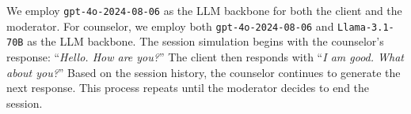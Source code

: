 We employ \texttt{gpt-4o-2024-08-06} as the LLM backbone for both the client and the moderator. For counselor, we employ both \texttt{gpt-4o-2024-08-06} and \texttt{Llama-3.1-70B} as the LLM backbone.
The session simulation begins with the counselor's response: ``\textit{Hello. How are you?}'' The client then responds with ``\textit{I am good. What about you?}'' Based on the session history, the counselor continues to generate the next response. This process repeats until the moderator decides to end the session.

\begin{comment}
\subsection{Client Simulation}
\label{app:client simulation}
Unlike previous works that predominantly simulate simple client personas~\citep{yosef2024assessing,wu2023towards} or use examples~\citep{chiu2024computational} in LLM prompts, we simulate a client with a few modules that model state transition, dynamic engagement, action selection, and response generation separately. An input {\em client's profile} includes the client's behavioral problem, state of mind, persona, motivation, beliefs, and interests. As the counseling session progresses, the session context (utterance history) is also provided to the client simulator.

During a conversation session, a client is guided through different states to identify changes that can address their behavioral problem. Aligned with the counselor's setting, we also utilize the three states defined in transtheoretical model of health behavior change~\citep{prochaska2005transtheoretical,prochaska2008initial}. The goal of the state transition module is to maintain consistency with how the client may change states during MI counseling, as well as the client's profile. As our work aims to assess the counselor's effectiveness in motivating the client through topic exploration, we focus on the transition between first two states. In the Precontemplation state, the counselor focuses on building trust, establishing change goals, understanding the client's motivations, and addressing misconceptions before evoking a desire to change. The client is expected to enter the Contemplation state only when motivated by specific reason(s) introduced by the counselor. The state transition module thus ensures consistency by analyzing the counselor's utterances to identify mentions of the client's motivations. If such a mention is found, the next state is Contemplation; otherwise, the state remains unchanged.


\end{comment}
